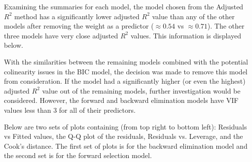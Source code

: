 \documentclass[a4paper, 11pt]{article}
\begin{document}
Examining the summaries for each model, the model chosen from the Adjusted $R^2$ method has a significantly lower adjusted $R^2$ value than any of the other models after removing the weight as a predictor ($\approx 0.54$ vs $\approx 0.71$). The other three models have very close adjusted $R^2$ values. This information is displayed below.
	\begin{center}
		
	\end{center}

With the similarities between the remaining models combined with the potential colinearity issues in the BIC model, the decision was made to remove this model from consideration. If the model had a significantly higher (or even the highest) adjusted $R^2$ value out of the remaining models, further investigation would be considered. However, the forward and backward elimination models have VIF values less than 3 for all of their predictors.

Below are two sets of plots containing (from top right to bottom left): Residuals vs Fitted values, the Q-Q plot of the residuals, Residuals vs. Leverage, and the Cook's distance. The first set of plots is for the backward elimination model and the second set is for the forward selection model.
\end{document}
